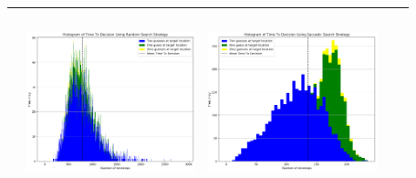 \begin{landscape}
\begin{table}[h!]
\begin{tabular}{ | c | c | c | c | c |}
\begin{minipage}[c][58mm][c]{49mm}
    \end{minipage}
    &
    \begin{minipage}[c][58mm][c]{49mm}
      \includegraphics[width=49mm, height=52mm]{Chapters/MultiAgentTargetDetection/Figs/Histograms/MultipleTarget/2/2RandomHistogram.png}
    \end{minipage}
    &
    \begin{minipage}[c][58mm][c]{49mm}
      \includegraphics[width=49mm, height=52mm]{Chapters/MultiAgentTargetDetection/Figs/Histograms/MultipleTarget/2/2SaccadicHistogram.png}
    \end{minipage}
    \\
    \hline


\end{tabular}
\end{table}
\end{landscape}

